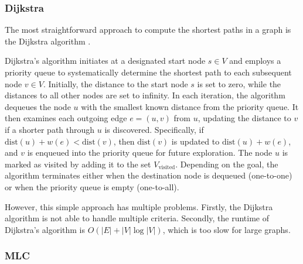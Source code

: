 \subsubsection{Dijkstra}
\label{subsubsec:dijkstra}
The most straightforward approach to compute the shortest paths in a graph is the Dijkstra algorithm \cite{dijkstra1959note}.

Dijkstra's algorithm initiates at a designated start node \( s \in V \) and employs a priority queue to systematically determine the shortest path to each subsequent node \( v \in V \).
Initially, the distance to the start node \( s \) is set to zero, while the distances to all other nodes are set to infinity.
In each iteration, the algorithm dequeues the node \( u \) with the smallest known distance from the priority queue.
It then examines each outgoing edge \( e = (u, v) \) from \( u \), updating the distance to \( v \) if a shorter path through \( u \) is discovered.
Specifically, if \( \text{dist}(u) + w(e) < \text{dist}(v) \), then \( \text{dist}(v) \) is updated to \( \text{dist}(u) + w(e) \), and \( v \) is enqueued into the priority queue for future exploration.
The node \( u \) is marked as visited by adding it to the set \( V_{\text{visited}} \).
Depending on the goal, the algorithm terminates either when the destination node is dequeued (one-to-one) or when the priority queue is empty (one-to-all).


However, this simple approach has multiple problems.
Firstly, the Dijkstra algorithm is not able to handle multiple criteria.
Secondly, the runtime of Dijkstra's algorithm is \( O(|E| + |V| \log |V|) \), which is too slow for large graphs.

\subsubsection{MLC}
\label{subsubsec:mlc}

